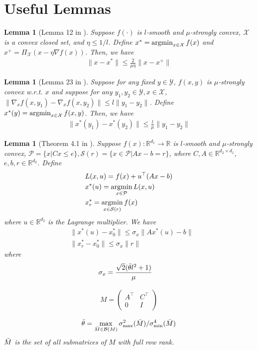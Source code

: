 \documentclass{article}
\newcommand{\Pc}{\mathcal{P}}
\newcommand{\Sc}{\mathcal{S}}
\newcommand{\Xc}{\mathcal{X}}
\newcommand{\Yc}{\mathcal{Y}}
\def\R{\mathbb{R}}
\newcommand{\argmin}{\mathop{\rm argmin}}
\theoremstyle{plain}
\newtheorem{lemma}[theorem]{Lemma}
\theoremstyle{definition}
\theoremstyle{remark}
\begin{document}
\section{Useful Lemmas}\label{app: lemma}
\begin{lemma} [Lemma 12 in \cite{chen2021communication}]\label{lemma: eb}
    Suppose $f(\cdot)$ is $l$-smooth and $\mu$-strongly convex, $\Xc$ is a convex closed set, and $\eta\leq 1/l$. Define $x^*=\argmin_{x\in\Xc} f(x)$ and $x^+=\Pi_\Xc(x-\eta \nabla f(x))$. Then, we have
    \begin{align*}
        \|x-x^*\|\leq \frac{2}{\mu\eta}\|x-x^+\|
    \end{align*}
\end{lemma}

\begin{lemma}[Lemma 23 in \cite{lin2020near}]\label{lemma: continuous}
    Suppose for any fixed $y\in \Yc$, $f(x,y)$ is $\mu$-strongly convex w.r.t. $x$ and suppose for any $y_1,y_2\in \Yc, x\in \Xc$,  $\|\nabla_x f(x, y_1)-\nabla_x f(x, y_2)\|\leq l\|y_1-y_2\|$. Define $x^*(y)=\argmin_{x\in\Xc} f(x,y)$. Then, we have
    \begin{align*}
        \|x^*(y_1)-x^*(y_2)\|\leq \frac{l}{\mu}\|y_1-y_2\|
    \end{align*}
\end{lemma}

\begin{lemma}[Theorem 4.1 in \cite{zhang2022global}]\label{lemma: linear}
Suppose $f(x): \R^{d_1}\to \R$ is $l$-smooth and $\mu$-strongly convex, $\Pc=\{x | Cx\leq e\}, \Sc(r)=\{x\in \Pc | Ax-b=r\}$, where $C, A\in\R^{d_2\times d_1}$, $e,b,r\in \R^{d_2}$.
Define
\begin{align*}
    &L(x,u)=f(x)+u^\top(Ax-b)\\
    &x^*(u)=\argmin_{x\in \Pc}L(x,u)\\
    &x^*_r=\argmin_{x\in \Sc(r)}f(x)
\end{align*}
where $u\in\R^{d_2}$ is the Lagrange multiplier. 
We have
\begin{align*}
    &\|x^*(u)-x^*_0\|\leq \sigma_x\|Ax^*(u)-b\|\\
    &\|x^*_r-x^*_0\|\leq \sigma_x\|r\|
\end{align*}
where 
    \begin{align*}
        &\sigma_x=\frac{\sqrt{2}(\Bar{\theta}l^2+1)}{\mu}
    \end{align*}

\begin{align*}
   M =
    \begin{pmatrix}
        A^\top & C^\top \\
        0 & I
    \end{pmatrix}
\end{align*}

\begin{align*}
    \Bar{\theta}=\max_{\Bar{M}\in \mathcal{B}(M)}\sigma^2_{\max}(\Bar{M})/\sigma^4_{\min}(\Bar{M})
\end{align*}
$\Bar{M}$ is the set of all submatrices of $M$ with full row rank.
\end{lemma}
\end{document}

